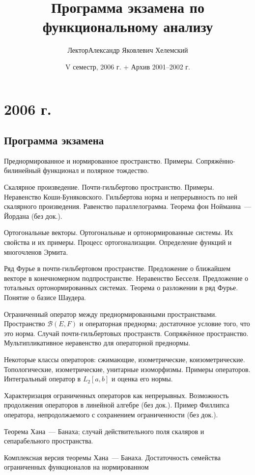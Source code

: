 \documentclass[a4paper]{article}
\title{Программа экзамена по функциональному анализу}
\author{Лектор\т Александр Яковлевич Хелемский}
\date{V семестр, 2006 г. + Архив 2001--2002 г.}
\begin{document}
\maketitle

\section*{2006 г.}

\subsection*{Программа экзамена}
\begin{nums}{-3}
\item Преднормированное и нормированное пространство. Примеры. Сопряжённо-билинейный функционал и полярное тождество.
\item Скалярное произведение. Почти-гильбертово пространство. Примеры. Неравенство Коши-Буняковского.
Гильбертова норма и непрерывность по ней скалярного произведения. Равенство параллелограмма.
Теорема фон Нойманна~--- Йордана (без док.).
\item Ортогональные векторы. Ортогональные и ортонормированные системы. Их свойства и их примеры.
Процесс ортогонализации. Определение функций и многочленов Эрмита.
\item Ряд Фурье в почти-гильбертовом пространстве. Предложение о ближайшем векторе в конечномерном подпространстве.
Неравенство Бесселя. Предложение о тотальных ортонормированных системах. Теорема о разложении в ряд Фурье.
Понятие о базисе Шаудера.
\item Ограниченный оператор между преднормированными пространствами. Пространство $\mathcal{B}(E,F)$ и операторная преднорма;
достаточное условие того, что это норма. Случай почти-гильбертовых пространств. Сопряжённое пространство.
Мультипликативное неравенство для операторной преднормы.
\item Некоторые классы операторов: сжимающие, изометрические, коизометрические. Топологические, изометрические,
унитарные изоморфизмы. Примеры операторов. Интегральный оператор в $L_2[a,b]$ и оценка его нормы.
\item Характеризация ограниченных операторов как непрерывных. Возможность продолжения операторов в линейной алгебре (без док.).
Пример Филлипса оператора, непродолжаемого с сохранением ограниченности (без док.).
\item Теорема Хана~--- Банаха; случай действительного поля скаляров и сепарабельного пространства.
\item Комплексная версия теоремы Хана~--- Банаха. Достаточность семейства ограниченных функционалов на нормированном

\end{nums}
\end{document}
